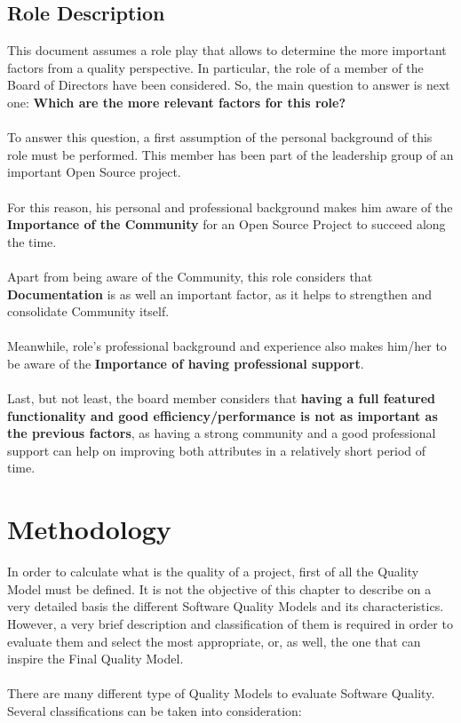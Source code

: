\documentclass[11pt]{article}
\begin{document}
\begin{itemize}
\subsection{Role Description}
This document assumes a role play that allows to determine the more important factors from a quality perspective. In particular, the role of a member of the Board of Directors have been considered. So, the main question to answer is next one: \textbf{Which are the more relevant factors for this role?}\\
\\
To answer this question, a first assumption of the personal background of this role must be performed. This member has been part of the leadership group of an important Open Source project.\\
\\
For this reason, his personal and professional background makes him aware of the \textbf{Importance of the Community} for an Open Source Project to succeed along the time.\\
\\
Apart from being aware of the Community, this role considers that \textbf{Documentation} is as well an important factor, as it helps to strengthen and consolidate Community itself.\\
\\
Meanwhile, role's professional background and experience also makes him/her to be aware of the \textbf{Importance of having professional support}.\\
\\
Last, but not least, the board member considers that \textbf{having a full featured functionality and good efficiency/performance is not as important as the previous factors}, as having a strong community and a good professional support can help on improving both attributes in a relatively short period of time.
\end{itemize}

\section{Methodology} \label{sec:methodology}
In order to calculate what is the quality of a project, first of all the Quality Model must be defined. It is not the objective of this chapter to describe on a very detailed basis the different Software Quality Models and its characteristics. However, a very brief description and classification of them is required in order to evaluate them and select the most appropriate, or, as well, the one that can inspire the Final Quality Model.\\
\\
There are many different type of Quality Models to evaluate Software Quality. Several classifications can be taken into consideration:
\end{document}
